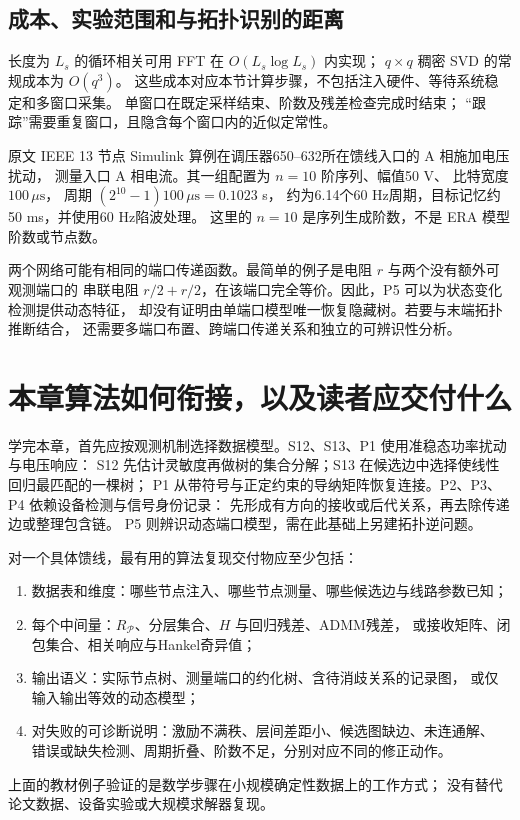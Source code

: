 \documentclass[UTF8,11pt,fontset=fandol,openany,oneside]{ctexbook}
\theoremstyle{definition}
\theoremstyle{remark}
\numberwithin{equation}{chapter}
\begin{document}
\subsection{成本、实验范围和与拓扑识别的距离}
长度为 $L_s$ 的循环相关可用 FFT 在 $O(L_s\log L_s)$ 内实现；
$q\times q$ 稠密 SVD 的常规成本为 $O(q^3)$。
这些成本对应本节计算步骤，不包括注入硬件、等待系统稳定和多窗口采集。
单窗口在既定采样结束、阶数及残差检查完成时结束；
“跟踪”需要重复窗口，且隐含每个窗口内的近似定常性。

原文 IEEE 13 节点 Simulink 算例在调压器650--632所在馈线入口的 A 相施加电压扰动，
测量入口 A 相电流。其一组配置为 $n=10$ 阶序列、幅值50 V、
比特宽度 $100\,\mu\mathrm{s}$，
周期 $(2^{10}-1)100\,\mu\mathrm{s}=0.1023$ s，
约为6.14个60 Hz周期，目标记忆约50 ms，并使用60 Hz陷波处理。
这里的 $n=10$ 是序列生成阶数，不是 ERA 模型阶数或节点数。

两个网络可能有相同的端口传递函数。最简单的例子是电阻 $r$ 与两个没有额外可观测端口的
串联电阻 $r/2+r/2$，在该端口完全等价。因此，P5 可以为状态变化检测提供动态特征，
却没有证明由单端口模型唯一恢复隐藏树。若要与末端拓扑推断结合，
还需要多端口布置、跨端口传递关系和独立的可辨识性分析。

\section{本章算法如何衔接，以及读者应交付什么}
学完本章，首先应按观测机制选择数据模型。S12、S13、P1 使用准稳态功率扰动与电压响应：
S12 先估计灵敏度再做树的集合分解；S13 在候选边中选择使线性回归最匹配的一棵树；
P1 从带符号与正定约束的导纳矩阵恢复连接。P2、P3、P4 依赖设备检测与信号身份记录：
先形成有方向的接收或后代关系，再去除传递边或整理包含链。
P5 则辨识动态端口模型，需在此基础上另建拓扑逆问题。

对一个具体馈线，最有用的算法复现交付物应至少包括：
\begin{enumerate}
 \item 数据表和维度：哪些节点注入、哪些节点测量、哪些候选边与线路参数已知；
 \item 每个中间量：$R_{\mathcal P}$、分层集合、$H$ 与回归残差、ADMM残差，
       或接收矩阵、闭包集合、相关响应与Hankel奇异值；
 \item 输出语义：实际节点树、测量端口的约化树、含待消歧关系的记录图，
       或仅输入输出等效的动态模型；
 \item 对失败的可诊断说明：激励不满秩、层间差距小、候选图缺边、未连通解、
       错误或缺失检测、周期折叠、阶数不足，分别对应不同的修正动作。
\end{enumerate}
上面的教材例子验证的是数学步骤在小规模确定性数据上的工作方式；
没有替代论文数据、设备实验或大规模求解器复现。
\end{document}
